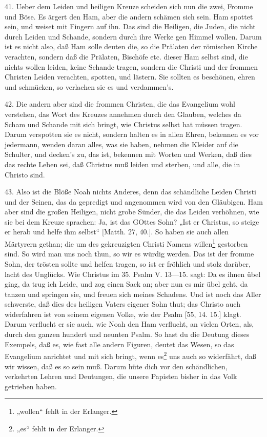 41. Ueber dem Leiden und heiligen Kreuze scheiden sich nun die zwei, Fromme und Böse. Es ärgert den Ham, aber die andern schämen sich sein. Ham spottet sein, und weiset mit Fingern auf ihn. Das sind die Heiligen, die Juden, die nicht durch Leiden und Schande, sondern durch ihre Werke gen Himmel wollen. Darum ist es nicht also, daß Ham solle deuten die, so die Prälaten der römischen Kirche verachten, sondern daß die Prälaten, Bischöfe etc. dieser Ham selbst sind, die nichts wollen leiden, keine Schande tragen, sondern die Christi und der frommen Christen Leiden verachten, spotten, und lästern. Sie sollten es beschönen, ehren und schmücken, so verlachen sie es und verdammen’s.

42. Die andern aber sind die frommen Christen, die das Evangelium wohl verstehen, das Wort des Kreuzes annehmen durch den Glauben, welches da Scham und Schande mit sich bringt, wie Christus selbst hat müssen tragen. Darum verspotten sie es nicht, sondern halten es in allen Ehren, bekennen es vor jedermann, wenden daran alles, was sie haben, nehmen die Kleider auf die Schulter, und decken’s zu, das ist, bekennen mit Worten und Werken, daß dies das rechte Leben sei, daß Christus muß leiden und sterben, und alle, die in Christo sind.

43. Also ist die Blöße Noah nichts Anderes, denn das schändliche Leiden Christi und der Seinen, das da gepredigt und angenommen wird von den Gläubigen. Ham aber sind die großen Heiligen, nicht grobe Sünder, die das Leiden verhöhnen, wie sie bei dem Kreuze sprachen: Ja, ist das GOttes Sohn? „Ist er Christus, so steige er herab und helfe ihm selbst“ [Matth. 27, 40.]. So haben sie auch allen Märtyrern gethan; die um des gekreuzigten Christi Namens willen\footnote{„wollen“ fehlt in der Erlanger.} gestorben sind. So wird man uns noch thun, so wir es würdig werden. Das ist der fromme Sohn, der trösten sollte und helfen tragen, so ist er fröhlich und stolz darüber, lacht des Unglücks. Wie Christus im 35. Psalm V. 13—15. sagt: Da es ihnen übel ging, da trug ich Leide, und zog einen Sack an; aber nun es mir übel geht, da tanzen und springen sie, und freuen sich meines Schadens. Und ist noch das Aller schwerste, daß dies des heiligen Vaters eigener Sohn thut; das Christo auch widerfahren ist von seinem eigenen Volke, wie der Psalm [55, 14. 15.] klagt. Darum verflucht er sie auch, wie Noah den Ham verflucht, an vielen Orten, als, durch den ganzen hundert und neunten Psalm. So hast du die Deutung dieses Exempels, daß es, wie fast alle andern Figuren, deutet das Wesen, so das Evangelium anrichtet und mit sich bringt, wenn es\footnote{„es“ fehlt in der Erlanger.} uns auch so widerfährt, daß wir wissen, daß es so sein muß. Darum hüte dich vor den schändlichen, verkehrten Lehren und Deutungen, die unsere Papisten bisher in das Volk getrieben haben.


